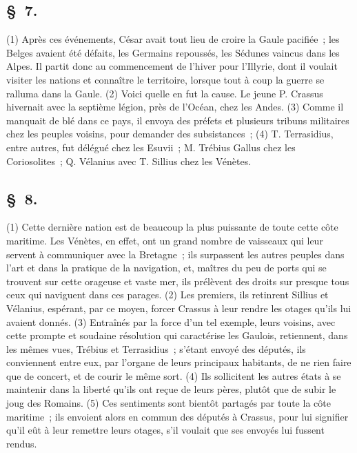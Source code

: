 \documentclass[french,twoside]{book} %
\begin{document}
\subsection[{§ 7.}]{ \textsc{§ 7.} }
\noindent (1) Après ces événements, César avait tout lieu de croire la Gaule pacifiée ; les Belges avaient été défaits, les Germains repoussés, les Sédunes vaincus dans les Alpes. Il partit donc au commencement de l’hiver pour l’Illyrie, dont il voulait visiter les nations et connaître le territoire, lorsque tout à coup la guerre se ralluma dans la Gaule. (2) Voici quelle en fut la cause. Le jeune P. Crassus hivernait avec la septième légion, près de l’Océan, chez les Andes. (3) Comme il manquait de blé dans ce pays, il envoya des préfets et plusieurs tribuns militaires chez les peuples voisins, pour demander des subsistances ; (4) T. Terrasidius, entre autres, fut délégué chez les Esuvii ; M. Trébius Gallus chez les Coriosolites ; Q. Vélanius avec T. Sillius chez les Vénètes.
\subsection[{§ 8.}]{ \textsc{§ 8.} }
\noindent (1) Cette dernière nation est de beaucoup la plus puissante de toute cette côte maritime. Les Vénètes, en effet, ont un grand nombre de vaisseaux qui leur servent à communiquer avec la Bretagne ; ils surpassent les autres peuples dans l’art et dans la pratique de la navigation, et, maîtres du peu de ports qui se trouvent sur cette orageuse et vaste mer, ils prélèvent des droits sur presque tous ceux qui naviguent dans ces parages. (2) Les premiers, ils retinrent Sillius et Vélanius, espérant, par ce moyen, forcer Crassus à leur rendre les otages qu’ils lui avaient donnés. (3) Entraînés par la force d’un tel exemple, leurs voisins, avec cette prompte et soudaine résolution qui caractérise les Gaulois, retiennent, dans les mêmes vues, Trébius et Terrasidius ; s’étant envoyé des députés, ils conviennent entre eux, par l’organe de leurs principaux habitants, de ne rien faire que de concert, et de courir le même sort. (4) Ils sollicitent les autres états à se maintenir dans la liberté qu’ils ont reçue de leurs pères, plutôt que de subir le joug des Romains. (5) Ces sentiments sont bientôt partagés par toute la côte maritime ; ils envoient alors en commun des députés à Crassus, pour lui signifier qu’il eût à leur remettre leurs otages, s’il voulait que ses envoyés lui fussent rendus.
\end{document}
